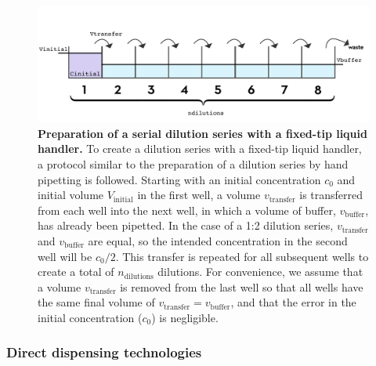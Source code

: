 \documentclass[aps,pre,twocolumn,nofootinbib,superscriptaddress,linenumbers]{revtex4-1}
\begin{document}
\begin{figure}[tb]
    \includegraphics[width=\columnwidth]{../figures/dilution.pdf}

  \caption{{\bf Preparation of a serial dilution series with a fixed-tip liquid handler.}
  To create a dilution series with a fixed-tip liquid handler, a protocol similar to the preparation of a dilution series by hand pipetting is followed.
  Starting with an initial concentration $c_0$ and initial volume $V_\mathrm{initial}$ in the first well, a volume $v_\mathrm{transfer}$ is transferred from each well into the next well, in which a volume of buffer, $v_\mathrm{buffer}$, has already been pipetted. 
  In the case of a 1:2 dilution series, $v_\mathrm{transfer}$ and $v_\mathrm{buffer}$ are equal, so the intended concentration in the second well will be $c_0/2$. 
  This transfer is repeated for all subsequent wells to create a total of $n_\mathrm{dilutions}$ dilutions. 
  For convenience, we assume that a volume $v_\mathrm{transfer}$ is removed from the last well so that all wells have the same final volume of $v_\mathrm{transfer} = v_\mathrm{buffer}$, and that the error in the initial concentration ($c_0$) is negligible.
  }
  \label{fig:dilution}
\end{figure}

\subsubsection*{Direct dispensing technologies}
\end{document}
